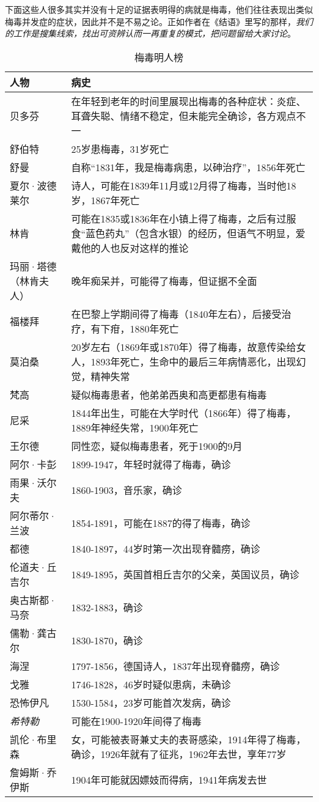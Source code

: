 下面这些人很多其实并没有十足的证据表明得的病就是梅毒，他们往往表现出类似梅毒并发症的症状，因此并不是不易之论。正如作者在《结语》里写的那样，\emph{我们的工作是搜集线索，找出可资辨认而一再重复的模式，把问题留给大家讨论}。

\begin{table}[htpb]
\centering
\caption{梅毒明人榜}
\begin{tabular}{p{}|p{}}

人物 & 病史 \\
\hline
贝多芬 & 在年轻到老年的时间里展现出梅毒的各种症状：炎症、耳聋失聪、情绪不稳定，但未能完全确诊，各方观点不一 \\
舒伯特 & 25岁患梅毒，31岁死亡 \\
舒曼 & 自称“1831年，我是梅毒病患，以砷治疗”，1856年死亡 \\
夏尔·波德莱尔 & 诗人，可能在1839年11月或12月得了梅毒，当时他18岁，1867年死亡 \\
林肯 & 可能在1835或1836年在小镇上得了梅毒，之后有过服食“蓝色药丸”（包含水银）的经历，但语气不明显，爱戴他的人也反对这样的推论 \\
玛丽·塔德（林肯夫人） & 晚年痴呆并，可能得了梅毒，但证据不全面 \\
福楼拜 & 在巴黎上学期间得了梅毒（1840年左右），后接受治疗，有下疳，1880年死亡 \\
莫泊桑 & 20岁左右（1869年或1870年）得了梅毒，故意传染给女人，1893年死亡，生命中的最后三年病情恶化，出现幻觉，精神失常 \\
梵高 & 疑似梅毒患者，他弟弟西奥和高更都患有梅毒\\
尼采 & 1844年出生，可能在大学时代（1866年）得了梅毒，1889年神经失常，1900年死亡 \\
王尔德 & 同性恋，疑似梅毒患者，死于1900的9月 \\
阿尔·卡彭 & 1899-1947，年轻时就得了梅毒，确诊 \\
雨果·沃尔夫 & 1860-1903，音乐家，确诊 \\
阿尔蒂尔·兰波 & 1854-1891，可能在1887的得了梅毒，确诊 \\
都德 & 1840-1897，44岁时第一次出现脊髓痨，确诊 \\
伦道夫·丘吉尔 & 1849-1895，英国首相丘吉尔的父亲，英国议员，确诊 \\
奥古斯都·马奈 & 1832-1883，确诊 \\
儒勒·龚古尔 & 1830-1870，确诊 \\
海涅 & 1797-1856，德国诗人，1837年出现脊髓痨，确诊 \\
戈雅 & 1746-1828，46岁时疑似患病，未确诊 \\
恐怖伊凡 & 1530-1584，23岁可能首次发病，确诊 \\
\emph{希特勒} & 可能在1900-1920年间得了梅毒 \\
凯伦·布里森 & 女，可能被表哥兼丈夫的表哥感染，1914年得了梅毒，确诊，1926年就有了征兆，1962年去世，享年77岁 \\
詹姆斯·乔伊斯 & 1904年可能就因嫖妓而得病，1941年病发去世 \\
\end{tabular}
\end{table}

